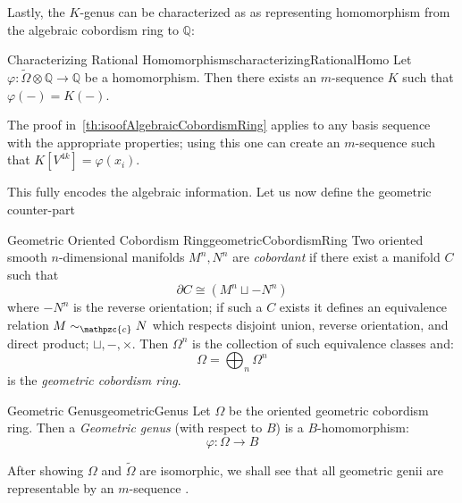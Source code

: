 \documentclass{ut-thesis}
\newenvironment{Proof}[1][]
  {\begin{ProofTcb}[#1]}
  {\end{ProofTcb}}
\newcommand{\Q}{{\mathbb{Q}}}
\newcommand{\cc}{{\mathpzc{c}}}
\renewcommand{\phi}{\varphi}
\newcommand{\dcup}{\sqcup}
\begin{document}

Lastly, the $K$-genus can be characterized as as representing homomorphism from the algebraic cobordism ring to
$\Q$:

\begin{thm}{Characterizing Rational Homomorphisms}{characterizingRationalHomo}
  Let $\phi: \widetilde{\Omega}\otimes \Q \to \Q$ be a homomorphism. Then there exists an $m$-sequence $K$ such that
  $\phi(-) = K(-)$.
\end{thm}


\begin{Proof}
  The proof in~\cref{th:isoofAlgebraicCobordismRing} applies to any basis sequence with the appropriate
  properties; using this one can create an $m$-sequence such that $K[V^{4k}] = \phi(x_i)$.
\end{Proof}

This fully encodes the algebraic information. Let us now define the geometric counter-part

\begin{defn}{Geometric Oriented Cobordism Ring}{geometricCobordismRing}
  Two oriented smooth $n$-dimensional manifolds $M^n, N^n$ are \emph{cobordant} if there exist a manifold $C$ such that
  \[
    \partial C \cong (M^n \dcup  -N^n)
  \]
  where $-N^n$ is the reverse orientation; if such a $C$ exists it defines an equivalence relation $M\sim_\cc
  N$ which respects disjoint union, reverse orientation, and direct product; $\dcup, -, \times$. Then
  $\Omega^n$ is the collection of such equivalence classes and:
  \[
    \Omega = \bigoplus_n \Omega^n
  \]
  is the \emph{geometric cobordism ring}.
\end{defn}

\begin{defn}{Geometric Genus}{geometricGenus}
  Let $\Omega$ be the oriented geometric cobordism ring. Then a \emph{Geometric genus} (with respect to $B$)
  is a $B$-homomorphism:
  \[
    \phi: \Omega \to B
  \]
\end{defn}

After showing $\Omega$ and $\widetilde{\Omega}$ are isomorphic, we shall see that all geometric genii are
representable by an $m$-sequence .
\end{document}
